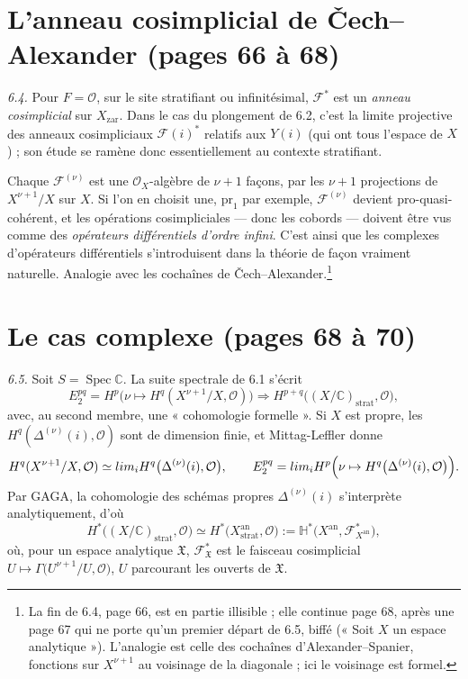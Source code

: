 \documentclass[11pt,a4paper]{article}
\begin{document}
\section*{L'anneau cosimplicial de Čech--Alexander (pages 66 à 68)}

\emph{6.4.} Pour $F = \mathcal{O}$, sur le site stratifiant ou infinitésimal,
$\mathcal{F}^{*}$ est un \emph{anneau cosimplicial} sur $X_{\mathrm{zar}}$.
Dans le cas du plongement de 6.2, c'est la limite projective des anneaux
cosimpliciaux $\mathcal{F}(i)^{*}$ relatifs aux $Y(i)$ (qui ont tous l'espace
de $X$) ; son étude se ramène donc essentiellement au contexte
stratifiant.

Chaque $\mathcal{F}^{(\nu)}$ est une $\mathcal{O}_X$-algèbre de $\nu+1$
façons, par les $\nu+1$ projections de $X^{\nu+1}/X$ sur $X$. Si l'on en
choisit une, $\mathrm{pr}_1$ par exemple, $\mathcal{F}^{(\nu)}$ devient
pro-quasi-cohérent, et les opérations cosimpliciales — donc les cobords —
doivent être vus comme des \emph{opérateurs différentiels d'ordre infini}.
C'est ainsi que les complexes d'opérateurs différentiels s'introduisent dans
la théorie de façon vraiment naturelle. Analogie avec les cochaînes de
Čech--Alexander.\footnote{La fin de 6.4, page 66, est en partie illisible ;
elle continue page 68, après une page 67 qui ne porte qu'un premier départ
de 6.5, biffé (« Soit $X$ un espace analytique »). L'analogie est celle des
cochaînes d'Alexander--Spanier, fonctions sur $X^{\nu+1}$ au voisinage de la
diagonale ; ici le voisinage est formel.}

\section*{Le cas complexe (pages 68 à 70)}

\emph{6.5.} Soit $S = \operatorname{Spec} \mathbb{C}$. La suite spectrale de
6.1 s'écrit
\[
  E_{2}^{pq} = H^{p}\bigl(\nu \mapsto H^{q}(X^{\nu+1}/X,
  \mathcal{O})\bigr) \Longrightarrow
  H^{p+q}\bigl((X/\mathbb{C})_{\mathrm{strat}}, \mathcal{O}\bigr) ,
\]
avec, au second membre, une « cohomologie formelle ». Si $X$ est propre, les
$H^{q}(\Delta^{(\nu)}(i), \mathcal{O})$ sont de dimension finie, et
Mittag-Leffler donne
\[
  H^{q}(X^{\nu+1}/X, \mathcal{O}) \simeq \varprojlim_{i}
  H^{q}\bigl(\Delta^{(\nu)}(i), \mathcal{O}\bigr) ,
  \qquad
  E_{2}^{pq} = \varprojlim_{i} H^{p}\Bigl(\nu \mapsto
  H^{q}\bigl(\Delta^{(\nu)}(i), \mathcal{O}\bigr)\Bigr) .
\]
Par GAGA, la cohomologie des schémas propres $\Delta^{(\nu)}(i)$ s'interprète
analytiquement, d'où
\[
  H^{*}\bigl((X/\mathbb{C})_{\mathrm{strat}}, \mathcal{O}\bigr) \simeq
  H^{*}\bigl(X^{\mathrm{an}}_{\mathrm{strat}}, \mathcal{O}\bigr)
  := \mathbb{H}^{*}\bigl(X^{\mathrm{an}}, \mathcal{F}^{*}_{X^{\mathrm{an}}}\bigr) ,
\]
où, pour un espace analytique $\mathfrak{X}$, $\mathcal{F}^{*}_{\mathfrak{X}}$
est le faisceau cosimplicial $U \mapsto \Gamma\bigl(U^{\nu+1}/U,
\mathcal{O}\bigr)$, $U$ parcourant les ouverts de $\mathfrak{X}$.
\end{document}
